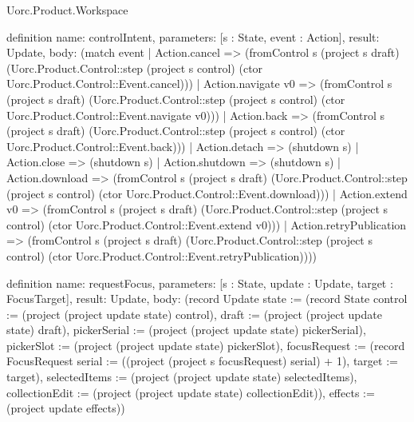 \begin{lexlean}{Uorc.Product.Workspace}
\begin{semanticmodule}
definition{
  name: controlIntent,
  parameters: [s : State, event : Action],
  result: Update,
  body: (match event
    | Action.cancel => (fromControl s (project s draft) (Uorc.Product.Control::step (project s control) (ctor Uorc.Product.Control::Event.cancel)))
    | Action.navigate v0 => (fromControl s (project s draft) (Uorc.Product.Control::step (project s control) (ctor Uorc.Product.Control::Event.navigate v0)))
    | Action.back => (fromControl s (project s draft) (Uorc.Product.Control::step (project s control) (ctor Uorc.Product.Control::Event.back)))
    | Action.detach => (shutdown s)
    | Action.close => (shutdown s)
    | Action.shutdown => (shutdown s)
    | Action.download => (fromControl s (project s draft) (Uorc.Product.Control::step (project s control) (ctor Uorc.Product.Control::Event.download)))
    | Action.extend v0 => (fromControl s (project s draft) (Uorc.Product.Control::step (project s control) (ctor Uorc.Product.Control::Event.extend v0)))
    | Action.retryPublication => (fromControl s (project s draft) (Uorc.Product.Control::step (project s control) (ctor Uorc.Product.Control::Event.retryPublication))))
}

definition{
  name: requestFocus,
  parameters: [s : State, update : Update, target : FocusTarget],
  result: Update,
  body: (record Update {state := (record State {control := (project (project update state) control), draft := (project (project update state) draft), pickerSerial := (project (project update state) pickerSerial), pickerSlot := (project (project update state) pickerSlot), focusRequest := (record FocusRequest {serial := ((project (project s focusRequest) serial) + 1), target := target}), selectedItems := (project (project update state) selectedItems), collectionEdit := (project (project update state) collectionEdit)}), effects := (project update effects)})
}


\end{semanticmodule}
\end{lexlean}

